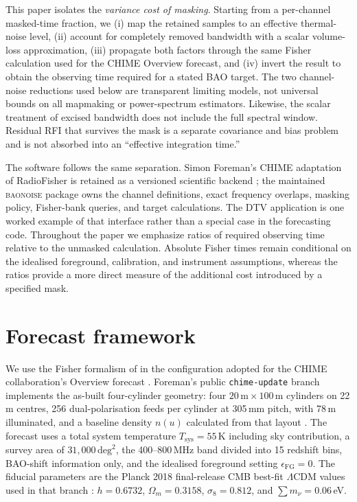 This paper isolates the \emph{variance cost of masking}. Starting from a
per-channel masked-time fraction, we (i) map the retained samples to an
effective thermal-noise level, (ii) account for completely removed
bandwidth with a scalar volume-loss approximation, (iii) propagate both
factors through the same Fisher calculation used for the CHIME Overview
forecast, and (iv) invert the result to obtain the observing time
required for a stated BAO target. The two channel-noise reductions used
below are transparent limiting models, not universal bounds on all
mapmaking or power-spectrum estimators. Likewise, the scalar treatment
of excised bandwidth does not include the full spectral window.
Residual RFI that survives the mask is a separate covariance and bias
problem and is not absorbed into an ``effective integration time.''

The software follows the same separation. Simon Foreman's CHIME
adaptation of RadioFisher is retained as a versioned scientific backend
\citep{Foreman2021,Bull2015}; the maintained \textsc{baonoise} package
owns the channel definitions, exact frequency overlaps, masking policy,
Fisher-bank queries, and target calculations. The DTV application is one
worked example of that interface rather than a special case in the
forecasting code. Throughout the paper we emphasize ratios of required
observing time relative to the unmasked calculation. Absolute Fisher
times remain conditional on the idealised foreground, calibration, and
instrument assumptions, whereas the ratios provide a more direct measure
of the additional cost introduced by a specified mask.

\section{Forecast framework}
\label{sec:framework}

We use the Fisher formalism of \citet{Bull2015} in the configuration
adopted for the CHIME collaboration's Overview forecast
\citep[Appendix~A and Table~2]{CHIMEOverview2022}. Foreman's public
\texttt{chime-update} branch implements the as-built four-cylinder
geometry: four $20\,\mathrm{m}\times100\,\mathrm{m}$ cylinders on 22\,m
centres, 256 dual-polarisation feeds per cylinder at 305\,mm pitch, with
78\,m illuminated, and a baseline density $n(u)$ calculated from that
layout \citep{Foreman2021}. The forecast uses a total system temperature
$T_\mathrm{sys}=55$\,K including sky contribution, a survey area of
$31{,}000\,\mathrm{deg}^2$, the 400--800\,MHz band divided into 15
redshift bins, BAO-shift information only, and the idealised foreground
setting $\epsilon_\mathrm{FG}=0$. The fiducial parameters are the Planck
2018 final-release CMB best-fit $\Lambda$CDM values used in that branch
\citep{Planck2018}: $h=0.6732$, $\Omega_m=0.3158$, $\sigma_8=0.812$, and
$\sum m_\nu = 0.06$\,eV.

